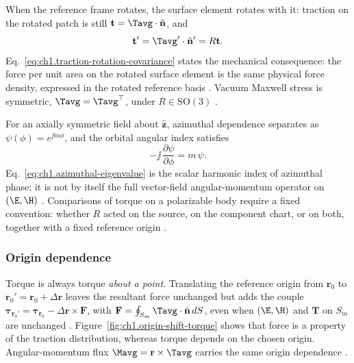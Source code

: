 When the reference frame rotates, the surface element rotates with it: traction on the rotated patch is still $\mathbf{t}=\Tavg\cdot\hat{\mathbf{n}}$, and
\begin{equation}
\label{eq:ch1.traction-rotation-covariance}
\mathbf{t}'=\Tavg'\cdot\hat{\mathbf{n}}' = R\mathbf{t}.
\end{equation}
Eq.~\eqref{eq:ch1.traction-rotation-covariance} states the mechanical consequence: the force per unit area on the rotated surface element is the same physical force density, expressed in the rotated reference basis \cite{beth1936}. Vacuum Maxwell stress is symmetric, \(\Tavg=\Tavg^\top\), under \(R\in\mathrm{SO}(3)\) \cite{maxwell1873}.

For an axially symmetric field about \(\hat{\mathbf{z}}\), azimuthal dependence separates as \(\psi(\phi)=e^{\jj m\phi}\), and the orbital angular index satisfies
\begin{equation}
\label{eq:ch1.azimuthal-eigenvalue}
-\jj\,\frac{\partial\psi}{\partial\phi}=m\,\psi.
\end{equation}
Eq.~\eqref{eq:ch1.azimuthal-eigenvalue} is the scalar harmonic index of azimuthal phase; it is not by itself the full vector-field angular-momentum operator on \((\E,\H)\) \cite{stratton1941}. Comparisons of torque on a polarizable body require a fixed convention: whether $R$ acted on the source, on the component chart, or on both, together with a fixed reference origin \cite{beth1936,stratton1941}.

\label{eq:ch1.active-passive-duality}
\label{eq:ch1.tensor-invariant-trace}
\label{eq:ch1.stress-eigen-covariance}
\label{eq:ch1.rotation-group-action}
\label{eq:ch1.dyadic-covariance}
\label{eq:ch1.rank1-dyad-rotation}
\label{sec:ch01.3.2b}
\label{eq:ch1.total-angular-generator}
\label{eq:ch1.orbital-angular-generator}
\label{eq:ch1.spin-angular-generator}
\label{eq:ch1.rotation-from-generators}

\label{sec:ch01.3.3}
\subsubsection*{Origin dependence}

Torque is always torque \emph{about a point}. Translating the reference origin from $\mathbf{r}_0$ to $\mathbf{r}_0'=\mathbf{r}_0+\Delta\mathbf{r}$ leaves the resultant force unchanged but adds the couple $\boldsymbol{\tau}_{\mathbf{r}_0'}=\boldsymbol{\tau}_{\mathbf{r}_0}-\Delta\mathbf{r}\times\mathbf{F}$, with $\mathbf{F}=\oint_{S_m}\Tavg\cdot\hat{\mathbf{n}}\,dS$, even when $(\E,\H)$ and $\mathbf{T}$ on $S_m$ are unchanged \cite{beth1936,stratton1941}. Figure~\ref{fig:ch1.origin-shift-torque} shows that force is a property of the traction distribution, whereas torque depends on the chosen origin. Angular-momentum flux $\Mavg=\mathbf{r}\times\Tavg$ carries the same origin dependence \cite{stratton1941}.

